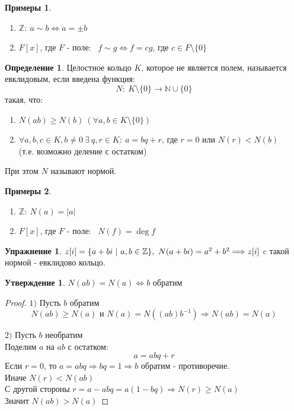 \documentclass[a4paper, 12pt]{article}
\newcommand{\Z}{\mathbb Z}
\newcommand{\N}{\mathbb N}
\newcommand\tab[1][.5cm]{\hspace*{#1}}
\theoremstyle{definition}
\newtheorem*{definition}{Определение}
\newtheorem*{subtheorem}{Утверждение}
\newtheorem*{example}{Примеры}
\newtheorem*{Exercise}{Упражнение}
\begin{document}
    \begin{example}\tab
      \begin{enumerate}
        \item $\Z: \ a \sim b \Longleftrightarrow a= \pm  b$
        \item $F[x]$, где $F$ - поле: \ 
        $f\sim g \Longleftrightarrow f = cg$, где $c \in F \setminus \{0\}$
      \end{enumerate}
    \end{example}
    \begin{definition}
      Целостное кольцо $K$, которое не является полем, называется евклидовым, если введена функция:
      $$N: \ K\setminus \{0\} \to \N \cup \{0\}$$
      такая, что:
      \begin{enumerate}
        \item $N(ab)\geq N(b) \ (\forall a, b \in K\setminus \{0\})$
        \item $\forall a, b, c \in K, b\neq 0 \ \exists \ q, r \in K :  \ a = bq+r$, где $r=0$ или $N(r)<N(b)$ \\
        (т.е. возможно деление с остатком)   
      \end{enumerate}
      При этом $N$ называют нормой.  
    \end{definition}
    \begin{example}\tab
      \begin{enumerate}
        \item $\Z: \  N(a) = |a|$
        \item $F[x]$, где $F$ - поле: \ $N(f) = \deg f$   
      \end{enumerate}
    \end{example}
    \begin{Exercise}
      $z[i] = \{a+bi \ | \ a, b \in \Z\}, \ N(a + bi) = a^2 + b^2 \Longrightarrow \\
      z[i]$ c такой нормой - евклидово кольцо. 
    \end{Exercise}
    \begin{subtheorem}
      $N(ab) = N(a) \Longleftrightarrow b$ обратим 
    \end{subtheorem}
    \begin{proof}\tab
      \item[$1)$] Пусть $b$ обратим
      $$N(ab) \geq N(a) \text{ и } N(a) = N((ab)b^{-1}) \Longrightarrow N(ab) = N(a)$$
      \item[$2)$] Пусть $b$ необратим\\
      Поделим $a$ на $ab$ с остатком: 
      $$a = abq + r$$
      Если $r =0$, то $a = abq \Longrightarrow bq = 1 \Longrightarrow b$ обратим - противоречие.\\
      Иначе $N(r)<N(ab)$\\
      С другой стороны $r = a - abq = a(1-bq) \Longrightarrow N(r) \geq N(a)$\\
      Значит $N(ab) > N(a)$ 
    \end{proof}
\end{document}
